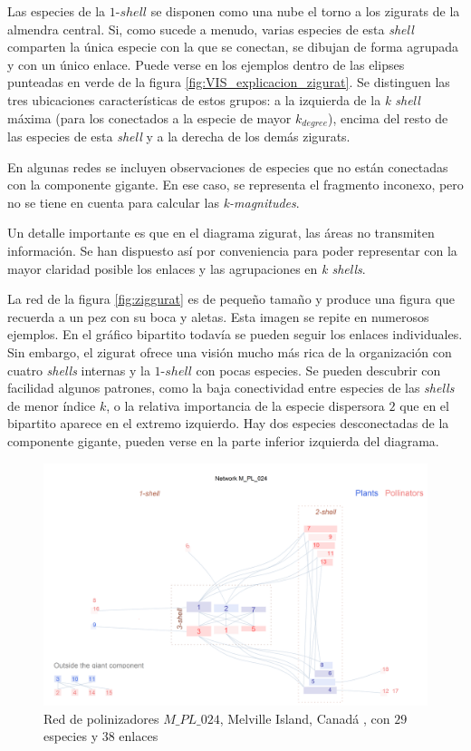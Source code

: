 Las especies de la $1$-$shell$ se disponen como una nube el torno a los zigurats de la almendra central. Si, como sucede a menudo, varias especies de esta \textit{shell} comparten la única especie con la que se conectan, se dibujan de forma agrupada y con un único enlace. Puede verse en los ejemplos dentro de las elipses punteadas en verde de la figura \ref{fig:VIS_explicacion_zigurat}. Se distinguen las tres ubicaciones características de estos grupos: a la izquierda de la \textit{k shell} máxima (para los conectados a la especie de mayor $k_{degree}$), encima del resto de las especies de esta \textit{shell} y a la derecha de los demás zigurats.

En algunas redes se incluyen observaciones de especies que no están conectadas con la componente gigante. En ese caso, se representa el fragmento inconexo, pero no se tiene en cuenta para calcular las \textit{k-magnitudes}.

Un detalle importante es que en el diagrama zigurat, las áreas no transmiten información. Se han dispuesto así por conveniencia para poder representar con la mayor claridad posible los enlaces y las agrupaciones en \textit{k shells}.

La red de la figura \ref{fig:ziggurat} es de pequeño tamaño y produce una figura que recuerda a un pez con su boca y aletas. Esta imagen se repite en numerosos ejemplos. En el gráfico bipartito todavía se pueden seguir los enlaces individuales. Sin embargo, el zigurat ofrece una visión mucho más rica de la organización con cuatro \textit{shells} internas y la $1$-$shell$ con pocas especies. Se pueden descubrir con facilidad algunos patrones, como la baja conectividad entre especies de las \textit{shells} de menor índice $k$, o la relativa importancia de la especie dispersora $2$ que en el bipartito aparece en el extremo izquierdo. Hay dos especies desconectadas de la componente gigante, pueden verse en la parte inferior izquierda del diagrama.

\begin{figure}[hp!]
\centering
\includegraphics[scale=0.45]{Figures/VIS_M_PL_024_ziggurat.png}
\caption {Red de polinizadores $M\_PL\_024$, Melville Island, Canadá \cite{mosquin1967observations}, con $29$ especies y $38$ enlaces}
\label{fig:VIS_zig_pl_024}
\end{figure}

